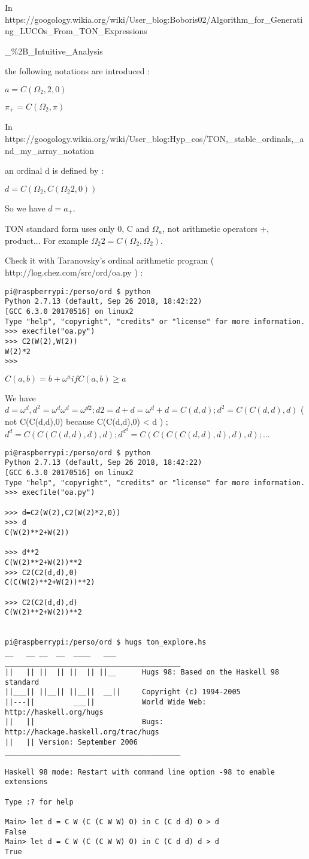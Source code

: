 \documentclass[10pt]{article}
\begin{document}
In https://googology.wikia.org/wiki/User\_blog:Boboris02/Algorithm\_for\_Generating\_LUCOs\_From\_TON\_Expressions

\_\%2B\_Intuitive\_Analysis 

the following notations are introduced :

 $a = C(\Omega_2,2,0)$
 
 $\pi_+ = C(\Omega_2,\pi)$
 
In https://googology.wikia.org/wiki/User\_blog:Hyp\_cos/TON,\_stable\_ordinals,\_and\_my\_array\_notation 

an ordinal d is defined by :

 $d = C(\Omega_2,C(\Omega_2 2, 0))$
 
So we have $d = a_+$.

TON standard form uses only 0, C and $\Omega_n$, not arithmetic operators +, product...
For example $\Omega_2 2 = C(\Omega_2,\Omega_2)$.

Check it with Taranovsky's ordinal arithmetic program ( http://log.chez.com/src/ord/oa.py ) :

\begin{verbatim}
pi@raspberrypi:/perso/ord $ python
Python 2.7.13 (default, Sep 26 2018, 18:42:22)
[GCC 6.3.0 20170516] on linux2
Type "help", "copyright", "credits" or "license" for more information.
>>> execfile("oa.py")
>>> C2(W(2),W(2))
W(2)*2
>>>
\end{verbatim}

$C(a,b) = b+\omega^a if C(a,b) \ge a$

We have $d = \omega^d, d^2 = \omega^d \omega^d = \omega^{d 2} ; d 2 = d + d = \omega^d + d = C(d,d) ; d^2 = C(C(d,d),d)$ ( not C(C(d,d),0) because C(C(d,d),0) < d ) ; $d^d = C(C(C(d,d),d),d) ; d^{d^d} = C(C(C(C(d,d),d),d),d) ; ... $

\begin{verbatim}
pi@raspberrypi:/perso/ord $ python
Python 2.7.13 (default, Sep 26 2018, 18:42:22)
[GCC 6.3.0 20170516] on linux2
Type "help", "copyright", "credits" or "license" for more information.
>>> execfile("oa.py")

>>> d=C2(W(2),C2(W(2)*2,0))
>>> d
C(W(2)**2+W(2))

>>> d**2
C(W(2)**2+W(2))**2
>>> C2(C2(d,d),0)
C(C(W(2)**2+W(2))**2)

>>> C2(C2(d,d),d)
C(W(2)**2+W(2))**2


pi@raspberrypi:/perso/ord $ hugs ton_explore.hs
__   __ __  __  ____   ___      _________________________________________
||   || ||  || ||  || ||__      Hugs 98: Based on the Haskell 98 standard
||___|| ||__|| ||__||  __||     Copyright (c) 1994-2005
||---||         ___||           World Wide Web: http://haskell.org/hugs
||   ||                         Bugs: http://hackage.haskell.org/trac/hugs
||   || Version: September 2006 _________________________________________

Haskell 98 mode: Restart with command line option -98 to enable extensions

Type :? for help

Main> let d = C W (C (C W W) O) in C (C d d) O > d
False
Main> let d = C W (C (C W W) O) in C (C d d) d > d
True
\end{verbatim}
\end{document}

